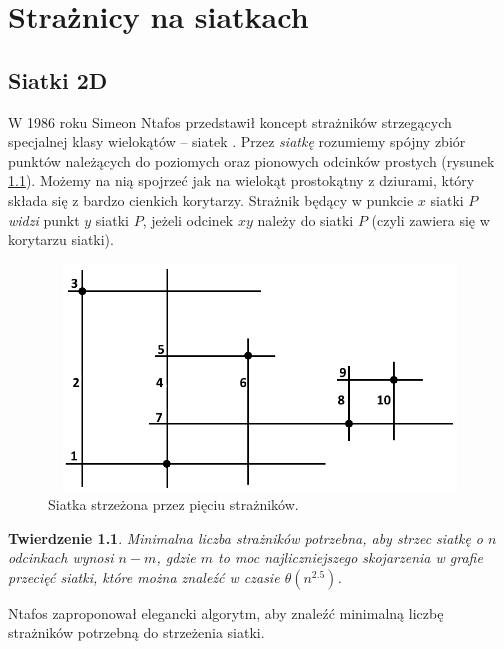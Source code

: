 \documentclass[brudnopis]{xmgr}
\newtheorem{Twierdzenie}{Twierdzenie}
\theoremstyle{definition}
\begin{document}
\chapter{Strażnicy na siatkach}
\section{Siatki 2D} \label{sec:siatki}
W 1986 roku Simeon Ntafos przedstawił koncept strażników strzegących specjalnej klasy wielokątów -- siatek \cite{ntafos}.
Przez \emph{siatkę} rozumiemy spójny zbiór punktów należących do poziomych oraz pionowych odcinków prostych (rysunek \ref{fig:siatka 2d}). Możemy na nią spojrzeć jak na wielokąt prostokątny z dziurami, który składa się z bardzo cienkich korytarzy.
Strażnik będący w punkcie $x$ siatki $P$ \emph{widzi} punkt $y$ siatki $P$, jeżeli odcinek $xy$ należy do siatki $P$ (czyli zawiera się w korytarzu siatki).
 \begin{figure}[ht!]
   \centering
   \includegraphics[width=14cm,height=6cm]{rysunki/przykladowa_siatka.png}
   \caption{Siatka strzeżona przez pięciu strażników.}
   \label{fig:siatka 2d}
 \end{figure} 

\begin{Twierdzenie} \cite{ntafos}
	Minimalna liczba strażników potrzebna, aby strzec siatkę o $n$ odcinkach wynosi $n - m$, gdzie $m$ to moc najliczniejszego skojarzenia w grafie przecięć siatki, które można znaleźć w czasie $\theta(n^{2.5})$.
\end{Twierdzenie}

Ntafos zaproponował elegancki algorytm, aby znaleźć minimalną liczbę strażników potrzebną do strzeżenia siatki.
\end{document}
